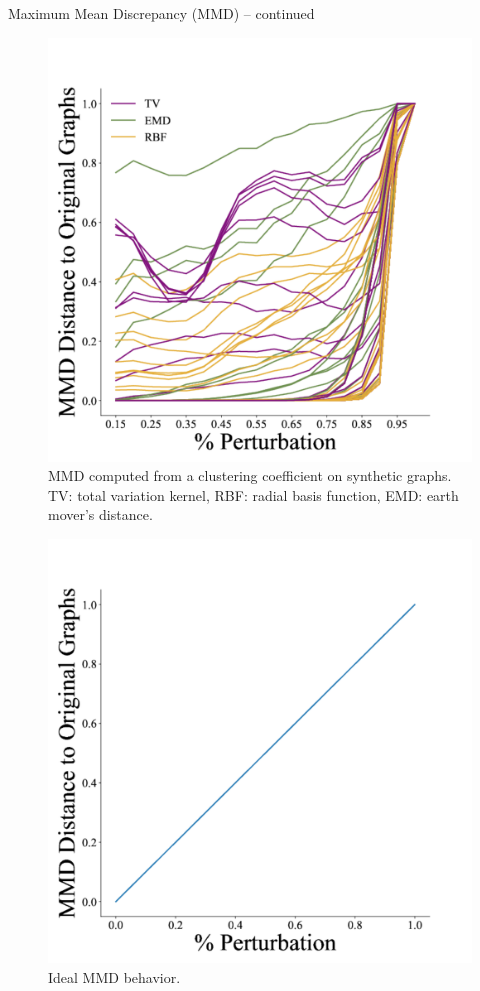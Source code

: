 \documentclass[aspectratio=169, 10pt, dvipsnames, handout]{beamer}
\begin{document}
\begin{frame}[fragile]{Maximum Mean Discrepancy (MMD) -- continued}
\begin{minipage}{0.68\textwidth}
  \end{minipage}
  \hfill
  \begin{minipage}{0.28\textwidth}
  \begin{figure}
    \centering
    \includegraphics[width=.7\textwidth]{./figures/leslie_work.pdf}
    \caption{MMD computed from a clustering coefficient on synthetic graphs. TV:
    total variation kernel, RBF: radial basis function, EMD: earth mover's distance.}
\end{figure}
\vspace{-14pt}
  \begin{figure}
    \centering
    \includegraphics[width=.7\textwidth]{./figures/ideal.pdf}
    \caption{Ideal MMD behavior.}
  \end{figure}
  \end{minipage}
\end{frame}
\end{document}
